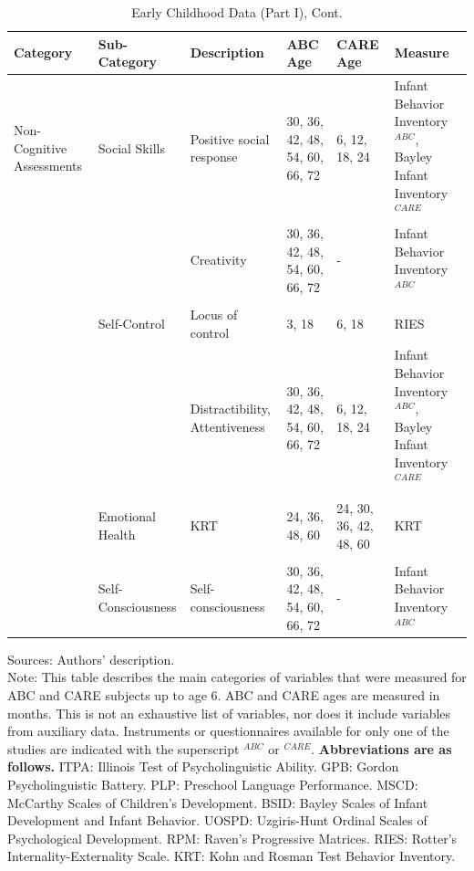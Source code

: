 \documentclass[static]{JJH-Beamer}
\begin{document}
\begin{frame}
 \addtocounter{framenumber}{-1}

\begin{table}[H]
\addtocounter{table}{-1}
\caption{Early Childhood Data (Part I), Cont.}
\begin{center}
\begin{tiny}
\begin{tabular}{L{1.4cm} C{2cm} C{1.5cm} C{1.3cm} C{1.3cm}  C{2cm}}
\toprule
\textbf{Category}	&	\textbf{Sub-Category}	&	\textbf{Description}	&	\textbf{ABC Age}  	&  \textbf{CARE Age}  & 	\textbf{Measure}	\\ \midrule
Non-Cognitive Assessments	&	Social Skills	&	Positive social response	&	30, 36, 42, 48, 54, 60, 66, 72	&	6, 12, 18, 24		&	Infant Behavior Inventory$^{ABC}$, Bayley Infant Inventory$^{CARE}$	\\
	&		&	Creativity	&	30, 36, 42, 48, 54, 60, 66, 72	&	- 	&	Infant Behavior Inventory$^{ABC}$	\\
	&	\\
	&	Self-Control	&	Locus of control	&	3, 18	&	6, 18	& 	RIES	\\
	&		&	Distractibility, Attentiveness	&	30, 36, 42, 48, 54, 60, 66, 72	&	6, 12, 18, 24		&	Infant Behavior Inventory$^{ABC}$, Bayley Infant Inventory$^{CARE}$	\\
	&	\\
	&	Emotional Health	&	KRT	&	24, 36, 48, 60	&	24, 30, 36, 42, 48, 60	&	KRT	\\
	&	\\
	&	Self-Consciousness	&	Self-consciousness	&	30, 36, 42, 48, 54, 60, 66, 72	&	-	&	Infant Behavior Inventory$^{ABC}$	\\
\bottomrule
\end{tabular}
\end{tiny}
\end{center}
\end{table}

\end{frame}

{\flushleft \normalsize Sources: Authors' description. \\	
Note: This table describes the main categories of variables that were measured for ABC and CARE subjects up to age 6. ABC and CARE ages are measured in months. This is not an exhaustive list of variables, nor does it include variables from auxiliary data. Instruments or questionnaires available for only one of the studies are indicated with the superscript $^{ABC}$ or $^{CARE}$.  \textbf{Abbreviations are as follows.} ITPA: Illinois Test of Psycholinguistic Ability. GPB: Gordon Psycholinguistic Battery. PLP: Preschool Language Performance. MSCD: McCarthy Scales of Children's Development. BSID: Bayley Scales of Infant Development and Infant Behavior. UOSPD: Uzgiris-Hunt Ordinal Scales of Psychological Development. RPM: Raven's Progressive Matrices. RIES: Rotter's Internality-Externality Scale. KRT: Kohn and Rosman Test Behavior Inventory.\\}
\clearpage
\end{document}
